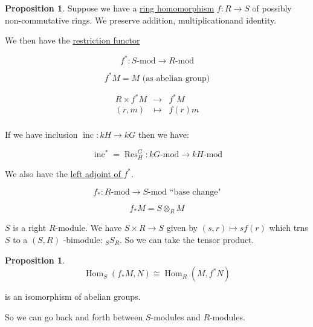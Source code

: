 \documentclass{article}
\theoremstyle{definition}
\newtheorem{proposition}[theorem]{Proposition}
\begin{document}
\begin{proposition}
    Suppose we have a \underline{ring homomorphism} \(f: R \to S\) of possibly non-commutative rings. We preserve addition, multiplicationand identity.

    We then have the \underline{restriction functor}

    \[
        f^{\ast} : S\text{-mod} \to R\text{-mod}
    \]

    \[
        f^{\ast} M = M \text{ (as abelian group)}
    \]

    \[
        \begin{array}{ccc}
            R \times f^{\ast} M & \to  &  f^{\ast} M \\
            (r,m) & \mapsto  &  f(r)m \\
        \end{array}
    \]
\end{proposition}

If we have inclusion \(\operatorname{inc}: kH \to kG\) then we have:

\[
    \operatorname{inc}^{\ast} = \operatorname{Res}_H^G : kG\text{-mod} \to kH\text{-mod} 
\]

We also have the \underline{left adjoint of \(f^{\ast}\)}.

\[
    f_{\ast} : R\text{-mod} \to S\text{-mod} \text{ ``base change"}
\]

\[
    f_{\ast} M = S \otimes _R M
\]

\(S\) is a right \(R\)-module. We have \(S \times R \to S\) given by \((s,r) \mapsto sf(r)\) which trns \(S\) to a \((S,R)\) -bimodule: \(_S S _R\). So we can take the tensor product.

\begin{proposition}
    \[
        \boxed{\operatorname{Hom}_S(f_{\ast} M, N) \cong \operatorname{Hom}_R (M, f^{\ast} N)}
    \]

    is an isomorphism of abelian groups.
\end{proposition}

So we can go back and forth between \(S\)-modules and \(R\)-modules.

\begin{center}


\end{center}
\end{document}
